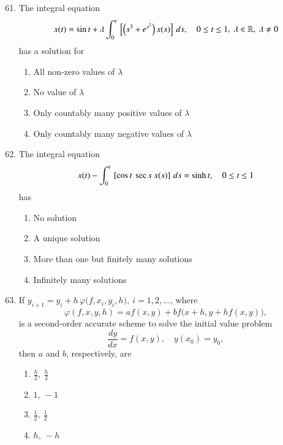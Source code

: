 \documentclass[journal,12pt,onecolumn]{IEEEtran}
\theoremstyle{remark}
\begin{document}
\begin{enumerate}
\setcounter{enumi}{60}

\item The integral equation  
\[
x(t) = \sin t + \lambda \int_0^t {}\left[ \left(s^3 + e^{s^2}\right) x(s) \right] \, ds, \quad 0 \le t \le 1,\ \lambda \in \mathbb{R},\ \lambda \ne 0
\]
has a solution for  
\\[-0.3em]\makebox[\textwidth][r]{\textit{[GATE EE 2025]}}

\begin{multicols}{2}
\begin{enumerate}[label=(\Alph*)]
\item All non-zero values of $\lambda$
\item No value of $\lambda$
\item Only countably many positive values of $\lambda$
\item Only countably many negative values of $\lambda$
\end{enumerate}
\end{multicols}

\item The integral equation  
\[
x(t) - \int_0^t {}\left[\cos t \ \sec s \ x(s)\right] \, ds = \sinh t, \quad 0 \le t \le 1
\]
has  
\\[-0.3em]\makebox[\textwidth][r]{\textit{[GATE EE 2025]}}

\begin{multicols}{2}
\begin{enumerate}[label=(\Alph*)]
\item No solution
\item A unique solution
\item More than one but finitely many solutions
\item Infinitely many solutions
\end{enumerate}
\end{multicols}

\item If $y_{i+1} = y_i + h\,\varphi\big( f, x_i, y_i, h \big),\ i = 1, 2, \dots$, where  
\[
\varphi(f, x, y, h) = a f(x, y) + b f\big( x + h, y + h f(x, y) \big),
\]
is a second-order accurate scheme to solve the initial value problem  
\[
\frac{dy}{dx} = f(x, y), \quad y(x_0) = y_0,
\]
then $a$ and $b$, respectively, are  
\\[-0.3em]\makebox[\textwidth][r]{\textit{[GATE EE 2025]}}

\begin{multicols}{2}
\begin{enumerate}[label=(\Alph*)]
\item $\frac{h}{2},\ \frac{h}{2}$
\item $1,\ -1$
\item $\frac{1}{2},\ \frac{1}{2}$
\item $h,\ -h$
\end{enumerate}
\end{multicols}


\end{enumerate}
\end{document}
